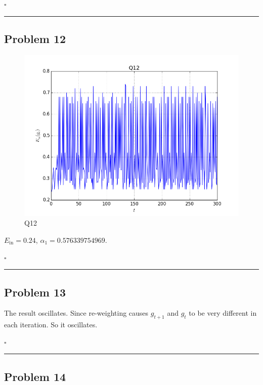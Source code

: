 \documentclass[12pt]{article}
\newcommand*{\QEDB}{\hfill\ensuremath{\square}}
\newcommand{\horrule}[1]{\rule{\linewidth}{#1}}
\begin{document}
\QEDB

\horrule{0.5pt}

\subsection*{Problem 12}

\begin{figure}[H]
	\centering
	\includegraphics[scale=0.5]{Q12.png}
	\caption{Q12}
	\label{Q12}
\end{figure}
$E_{\text{in}}=0.24$, $\alpha_1=0.576339754969$.

\QEDB

\horrule{0.5pt}

\subsection*{Problem 13}

The result oscillates. Since re-weighting causes $g_{t+1}$ and $g_t$ to be very different in each iteration. So it oscillates.

\QEDB

\horrule{0.5pt}

\subsection*{Problem 14}
\end{document}
